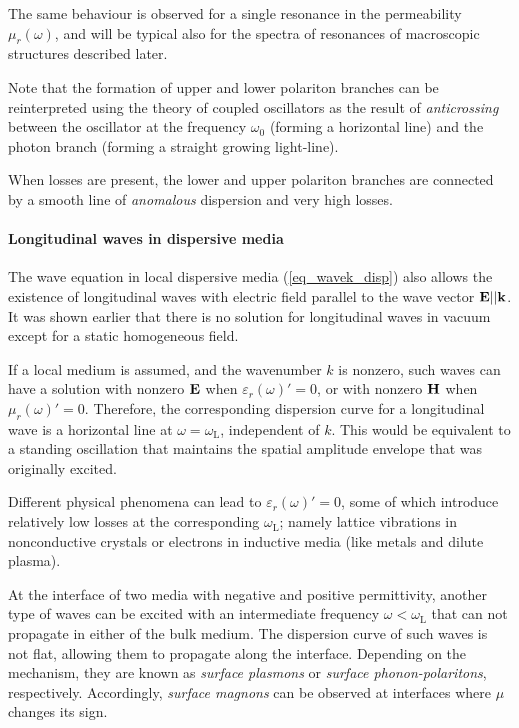 The same behaviour is observed for a single resonance in the permeability $\mu_r(\omega)$, and will be typical also for the spectra of resonances of macroscopic structures described later.

Note that the formation of upper and lower polariton branches can be reinterpreted\cite{landau1984electrodynamics} using the theory of coupled oscillators as the result of \textit{anticrossing} between the oscillator at the frequency $\omega_0$ (forming a horizontal line) and the photon branch (forming a straight growing light-line).

When losses are present, the lower and upper polariton branches are connected by a smooth line of \textit{anomalous} dispersion and very high losses.  %
\paragraph{Longitudinal waves in dispersive media} %
The wave equation in local dispersive media (\ref{eq_wavek_disp}) 
also allows the existence of longitudinal waves with electric field parallel to the wave vector $\mathbf{E} || {\mathbf{k}}$. It was shown earlier that there is no solution for longitudinal waves in vacuum except for a static homogeneous field.

If a local medium is assumed, and the wavenumber $k$ is nonzero, such waves can have a solution with nonzero $\mathbf{E}$ when $\varepsilon_r(\omega)' = 0$, or with nonzero $\mathbf{H}$ when $\mu_r(\omega)' = 0$. Therefore, the corresponding dispersion curve for a longitudinal wave is a horizontal line at $\omega = \omega_{\text{L}}$, independent of $k$. This would be equivalent to a standing oscillation that maintains the spatial amplitude envelope that was originally excited. 

Different physical phenomena can lead to $\varepsilon_r(\omega)' = 0$, some of which introduce relatively low losses at the corresponding $\omega_{\text{L}}$; namely lattice vibrations in nonconductive crystals or electrons in inductive media (like metals and dilute plasma). 

At the interface of two media with negative and positive permittivity, another type of waves can be excited with an intermediate frequency $\omega < \omega_{\text{L}}$ that can not propagate in either of the bulk medium. The dispersion curve of such waves is not flat, allowing them to propagate along the interface. Depending on the mechanism, they are known as  \textit{surface plasmons} or \textit{surface phonon-polaritons}, respectively. Accordingly, \textit{surface magnons} can be observed at interfaces where $\mu$ changes its sign.
